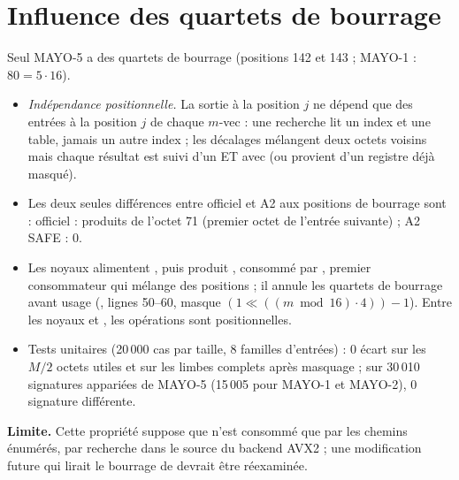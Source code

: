 \section{Influence des quartets de bourrage}\label{sec:bourrage}
Seul MAYO-5 a des quartets de bourrage (positions 142 et 143 ; MAYO-1 : $80=5\cdot16$).
\begin{itemize}
\item \Pc{} \emph{Indépendance positionnelle.} La sortie à la position $j$ ne dépend que des entrées à la position $j$ de chaque $m$-vec : une recherche lit un index et une table, jamais un autre index ; les décalages  mélangent deux octets voisins mais chaque résultat est suivi d'un ET avec  (ou provient d'un registre déjà masqué).
\item \Pc{} Les deux seules différences entre officiel et A2 aux positions de bourrage sont : officiel : produits de l'octet 71 (premier octet de l'entrée suivante) ; A2 SAFE : 0.
\item \Pc{} Les noyaux alimentent , puis  produit , consommé par , premier consommateur qui mélange des positions ; il annule les quartets de bourrage avant usage (, lignes 50--60, masque $(1\ll((m\bmod16)\cdot4))-1$). Entre les noyaux et , les opérations sont positionnelles.
\item \Pe{} Tests unitaires (20\,000 cas par taille, 8 familles d'entrées) : 0 écart sur les $M/2$ octets utiles et sur les limbes complets après masquage ; sur 30\,010 signatures appariées de MAYO-5 (15\,005 pour MAYO-1 et MAYO-2), 0 signature différente.
\end{itemize}
\textbf{Limite.} Cette propriété suppose que  n'est consommé que par les chemins énumérés, par recherche dans le source du backend AVX2 ; une modification future qui lirait le bourrage de  devrait être réexaminée.

